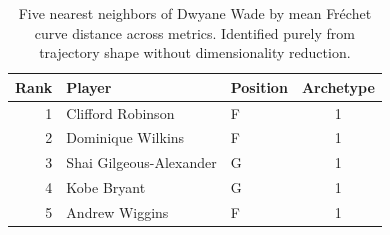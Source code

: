 \begin{table}[htbp]
  \centering\small
  \begin{tabular}{rllc}
    \toprule
    Rank & Player & Position & Archetype \\
    \midrule
    1 & Clifford Robinson & F & 1 \\
    2 & Dominique Wilkins & F & 1 \\
    3 & Shai Gilgeous-Alexander & G & 1 \\
    4 & Kobe Bryant & G & 1 \\
    5 & Andrew Wiggins & F & 1 \\
    \bottomrule
  \end{tabular}
  \caption{Five nearest neighbors of Dwyane Wade by mean Fr\'{e}chet curve distance across metrics. Identified purely from trajectory shape without dimensionality reduction.}
  \label{tab:Dwyane_Wade_frechet_curve_neighbors}
\end{table}

